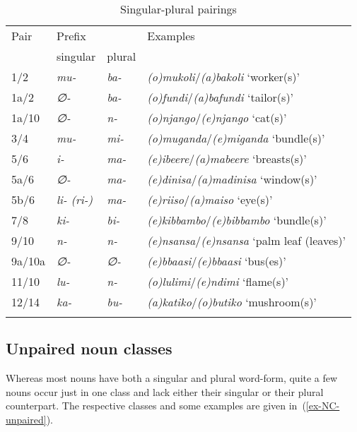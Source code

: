 \begin{table}
\caption{Singular-plural pairings}
\begin{tabular}{l l l p{6.5cm} }
\lsptoprule
Pair	& Prefix &  			& Examples\\
	& singular	 	& plural	& 	\\
\midrule

1/2	& \textit{mu-}	& \textit{ba-} & \textit{(o)mukoli}/\textit{(a)bakoli} `worker(s)'\\
1a/2	& \textit{∅-}	& \textit{ba-} & \textit{(o)fundi}/\textit{(a)bafundi} `tailor(s)' 	\\
1a/10	& \textit{∅-}	& \textit{n-} & \textit{(o)njango}/\textit{(e)njango} `cat(s)' 	\\

3/4	& \textit{mu-}	& \textit{mi-} & \textit{(o)muganda}/\textit{(e)miganda} ‘bundle(s)’	\\

5/6	& \textit{i-}	& \textit{ma-} & \textit{(e)ibeere}/\textit{(a)mabeere} ‘breasts(s)’	\\
5a/6	& \textit{∅-}	& \textit{ma-} & \textit{(e)dinisa}/\textit{(a)madinisa} ‘window(s)’	\\
5b/6	& \textit{li- (ri-)}	& \textit{ma-} & \textit{(e)riiso}/\textit{(a)maiso} ‘eye(s)’	\\
7/8	& \textit{ki-}	& \textit{bi-} & \textit{(e)kibbambo}/\textit{(e)bibbambo} ‘bundle(s)’	\\
9/10	& \textit{n-}	& \textit{n-} & \textit{(e)nsansa}/\textit{(e)nsansa} ‘palm leaf (leaves)’	\\
9a/10a	& \textit{∅-}	& \textit{∅-} & \textit{(e)bbaasi}/\textit{(e)bbaasi} ‘bus(es)’	\\

11/10	& \textit{lu-}	& \textit{n-} & \textit{(o)lulimi}/\textit{(e)ndimi} ‘flame(s)’	\\

12/14	& \textit{ka-}	& \textit{bu-} & \textit{(a)katiko}/\textit{(o)butiko} ‘mushroom(s)’	\\
\lspbottomrule
\end{tabular}
\label{tab-pairings}
\end{table}

\subsection{Unpaired noun classes}\label{sec-morh-unpaired}
Whereas most nouns have both a singular and plural word-form, quite a few nouns occur just in one class and lack either their singular or their plural counterpart. 
The respective classes and some examples are given in~(\ref{ex-NC-unpaired}).

